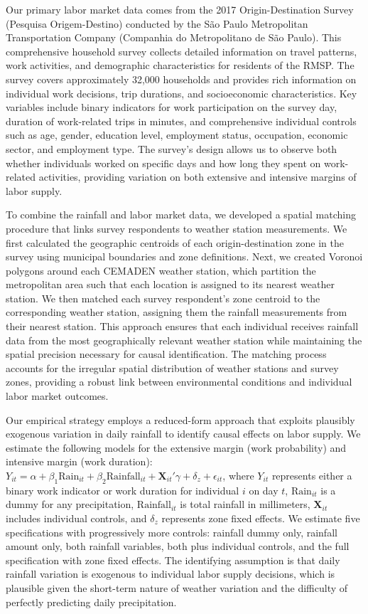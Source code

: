 Our primary labor market data comes from the 2017 Origin-Destination Survey (Pesquisa Origem-Destino) conducted by the São Paulo Metropolitan Transportation Company (Companhia do Metropolitano de São Paulo). This comprehensive household survey collects detailed information on travel patterns, work activities, and demographic characteristics for residents of the RMSP. The survey covers approximately 32,000 households and provides rich information on individual work decisions, trip durations, and socioeconomic characteristics. Key variables include binary indicators for work participation on the survey day, duration of work-related trips in minutes, and comprehensive individual controls such as age, gender, education level, employment status, occupation, economic sector, and employment type. The survey's design allows us to observe both whether individuals worked on specific days and how long they spent on work-related activities, providing variation on both extensive and intensive margins of labor supply.

To combine the rainfall and labor market data, we developed a spatial matching procedure that links survey respondents to weather station measurements. We first calculated the geographic centroids of each origin-destination zone in the survey using municipal boundaries and zone definitions. Next, we created Voronoi polygons around each CEMADEN weather station, which partition the metropolitan area such that each location is assigned to its nearest weather station. We then matched each survey respondent's zone centroid to the corresponding weather station, assigning them the rainfall measurements from their nearest station. This approach ensures that each individual receives rainfall data from the most geographically relevant weather station while maintaining the spatial precision necessary for causal identification. The matching process accounts for the irregular spatial distribution of weather stations and survey zones, providing a robust link between environmental conditions and individual labor market outcomes.

Our empirical strategy employs a reduced-form approach that exploits plausibly exogenous variation in daily rainfall to identify causal effects on labor supply. We estimate the following models for the extensive margin (work probability) and intensive margin (work duration): $Y_{it} = \alpha + \beta_1 \text{Rain}_{it} + \beta_2 \text{Rainfall}_{it} + \mathbf{X}_{it}'\gamma + \delta_z + \epsilon_{it}$, where $Y_{it}$ represents either a binary work indicator or work duration for individual $i$ on day $t$, $\text{Rain}_{it}$ is a dummy for any precipitation, $\text{Rainfall}_{it}$ is total rainfall in millimeters, $\mathbf{X}_{it}$ includes individual controls, and $\delta_z$ represents zone fixed effects. We estimate five specifications with progressively more controls: rainfall dummy only, rainfall amount only, both rainfall variables, both plus individual controls, and the full specification with zone fixed effects. The identifying assumption is that daily rainfall variation is exogenous to individual labor supply decisions, which is plausible given the short-term nature of weather variation and the difficulty of perfectly predicting daily precipitation.

